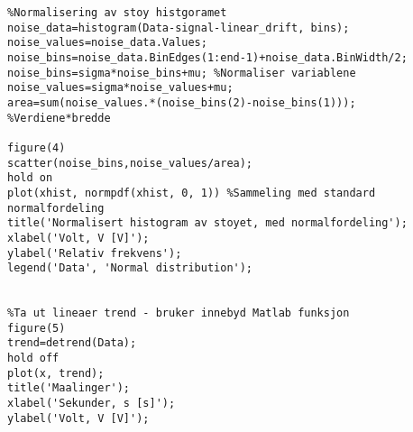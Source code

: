\documentclass[a4paper, 11pt]{article}
\begin{document}
\begin{enumerate}
\begin{lstlisting}
%Normalisering av stoy histgoramet
noise_data=histogram(Data-signal-linear_drift, bins);
noise_values=noise_data.Values;
noise_bins=noise_data.BinEdges(1:end-1)+noise_data.BinWidth/2;
noise_bins=sigma*noise_bins+mu; %Normaliser variablene
noise_values=sigma*noise_values+mu;
area=sum(noise_values.*(noise_bins(2)-noise_bins(1))); %Verdiene*bredde

figure(4)
scatter(noise_bins,noise_values/area);
hold on
plot(xhist, normpdf(xhist, 0, 1)) %Sammeling med standard normalfordeling
title('Normalisert histogram av stoyet, med normalfordeling');
xlabel('Volt, V [V]');
ylabel('Relativ frekvens');
legend('Data', 'Normal distribution');


%Ta ut lineaer trend - bruker innebyd Matlab funksjon
figure(5)
trend=detrend(Data);
hold off
plot(x, trend);
title('Maalinger');
xlabel('Sekunder, s [s]');
ylabel('Volt, V [V]');
\end{lstlisting}

\end{enumerate}
\end{document}
